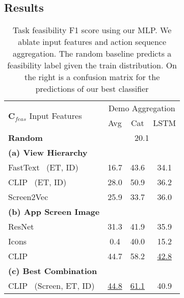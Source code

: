 \subsection{Results}
\begin{table}[t]
        \caption{Task feasibility F1 score using our MLP. We ablate input features and action sequence aggregation. The random baseline predicts a feasibility label given the train distribution. On the right is a confusion matrix for the predictions of our best classifier}
\begin{minipage}{0.6\textwidth}
    \centering
          \renewcommand\arraystretch{0.95}

    \begin{tabular}{|l|c|c|c|}
    \hline
       \multirow{2}{*}{\textbf{C}$_{feas}$ Input Features} & \multicolumn{3}{c|}{Demo Aggregation}\\
       \cline{2-4}
       & Avg & Cat & LSTM \\
       \hline
       \textbf{Random} & \multicolumn{3}{c|}{20.1} \\
       \hline
     \textbf{(a) View Hierarchy} & & & \\ 
     FastText~\cite{bojanowski-etal-2017-enriching} (ET, ID) & 16.7 & 43.6 & 34.1 \\ 
     CLIP~\cite{clip} (ET, ID) & 28.0 & 50.9 & 36.2 \\
     Screen2Vec~\cite{screen2vec} & 25.9 & 33.7 & 36.0 \\ 
      \hline
      \textbf{(b) App Screen Image} & & & \\
     ResNet~\cite{resnet} & 31.3 & 41.9 & 35.9 \\ 
    Icons~\cite{designsemantics} & 0.4 & 40.0 & 15.2 \\
    CLIP~\cite{clip} & 44.7 & 58.2 & \underline{42.8} \\
      \hline
      \textbf{(c) Best Combination} & & & \\
      CLIP~\cite{clip} (Screen, ET, ID) & \underline{44.8} & \underline{61.1} & 40.9 \\
      \hline
    \end{tabular}
\end{minipage}
\begin{minipage}{0.4\textwidth}
\centering


\end{minipage}
\end{table}
